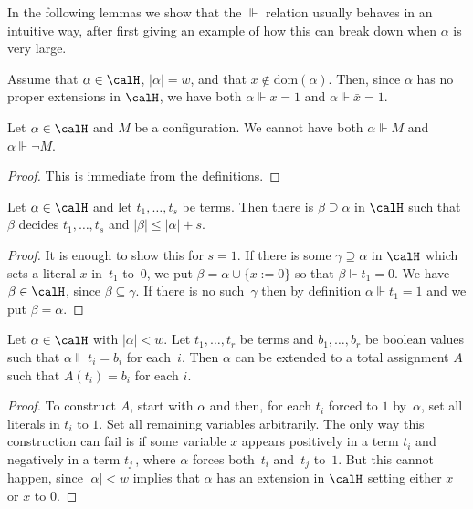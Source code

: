 \documentclass{toc}
\begin{document}
In the following lemmas we show that the $\Vdash$ relation usually
behaves in an intuitive way, after first giving an example of how this can
break down when $\alpha$ is very large.

\begin{example}
Assume that $\alpha \in \calH$, $|\alpha| = w$, and that $x \notin \mathrm{dom}(\alpha)$.
Then, since $\alpha$ has no proper extensions in $\calH$,
we have both $\alpha \Vdash x = 1$ and $\alpha \Vdash \bar x = 1$. 
\end{example}

\begin{lemma}\label{lem:contrforce} 
Let $\alpha\in \calH$ and $M$ be a configuration. 
We cannot have both $\alpha\Vdash M$ and  $\alpha \Vdash \neg M$.
\end{lemma}

\begin{proof}
This is immediate from the definitions.
\end{proof}

\begin{lemma} \label{lem:extend_to_decide}
Let $\alpha \in \calH$ and let $t_1, \dots, t_s$ be terms.
Then there is  $\beta \supseteq \alpha$ in $\calH$ such that $\beta$ 
decides $t_1, \dots, t_s$ and $|\beta| \le |\alpha|+s$.
\end{lemma}

\begin{proof}
It is enough to show this for $s=1$.
If there is some $\gamma \supseteq \alpha$ in $\calH$ which sets a literal $x$ in~$t_1$
to~$0$, we put $\beta = \alpha \cup \{ x := 0 \}$ so that
$\beta \Vdash t_{1}=0$. We have $\beta \in \calH$, since $\beta \subseteq \gamma$.
If there is no such~$\gamma$ then by definition
$\alpha \Vdash t_1=1$ and we put $\beta = \alpha$.
\end{proof}

\begin{lemma} \label{lem:forcing_to_total_assignment}
Let $\alpha \in \calH$ with $|\alpha|<w$.
Let $t_1, \dots, t_r$ be terms and $b_1, \dots, b_r$
be boolean values such that $\alpha \Vdash t_i= b_i$ for each~$i$.
Then $\alpha$ can be extended to a total assignment $A$
such that $A(t_i) = b_i$ for each $i$.
\end{lemma}

\begin{proof}
To construct $A$, start with $\alpha$ and then, 
for each $t_i$ forced to $1$ by~$\alpha$, set all literals in $t_i$ to $1$. 
Set all remaining variables arbitrarily.
The only way this construction can fail is if some 
variable $x$ appears positively in a term $t_i$
and negatively in a term $t_j$\,, where $\alpha$ forces
both~$t_i$ and~$t_j$ to~$1$.
But this cannot happen, since $|\alpha|<w$ implies that $\alpha$
has an extension in $\calH$
setting either $x$ or $\bar x$ to $0$.
\end{proof}
\end{document}
